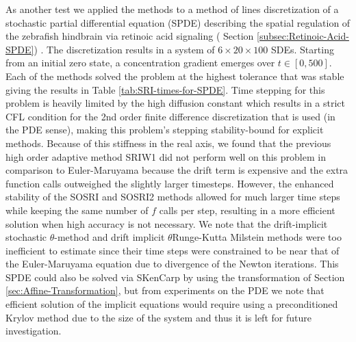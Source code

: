 \documentclass{article}
\begin{document}
As another test we applied the methods to a method of lines discretization
of a stochastic partial differential equation (SPDE) describing the
spatial regulation of the zebrafish hindbrain via retinoic acid signaling
( Section \ref{subsec:Retinoic-Acid-SPDE}) \cite{RN3805}. The discretization
results in a system of $6\times20\times100$ SDEs. Starting from an
initial zero state, a concentration gradient emerges over $t\in\left[0,500\right]$.
Each of the methods solved the problem at the highest tolerance that
was stable giving the results in Table \ref{tab:SRI-times-for-SPDE}.
Time stepping for this problem is heavily limited by the high diffusion
constant which results in a strict CFL condition for the 2nd order
finite difference discretization that is used (in the PDE sense),
making this problem's stepping stability-bound for explicit methods.
Because of this stiffness in the real axis, we found that the previous
high order adaptive method SRIW1 did not perform well on this problem
in comparison to Euler-Maruyama because the drift term is expensive
and the extra function calls outweighed the slightly larger timesteps.
However, the enhanced stability of the SOSRI and SOSRI2 methods allowed
for much larger time steps while keeping the same number of $f$ calls
per step, resulting in a more efficient solution when high accuracy
is not necessary. We note that the drift-implicit stochastic $\theta$-method
and drift implicit $\theta$Runge-Kutta Milstein methods were too
inefficient to estimate since their time steps were constrained to
be near that of the Euler-Maruyama equation due to divergence of the
Newton iterations. This SPDE could also be solved via SKenCarp by
using the transformation of Section \ref{sec:Affine-Transformation},
but from experiments on the PDE we note that efficient solution of
the implicit equations would require using a preconditioned Krylov
method due to the size of the system and thus it is left for future
investigation.
\end{document}
